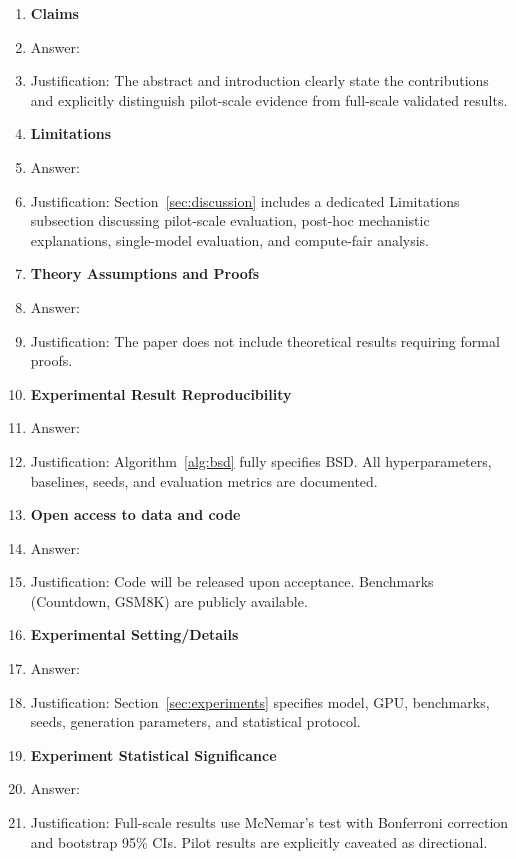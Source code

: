 \documentclass{article}
\begin{document}
\begin{enumerate}

\item {\bf Claims}
    \item[] Answer: \answerYes{}
    \item[] Justification: The abstract and introduction clearly state the contributions and explicitly distinguish pilot-scale evidence from full-scale validated results.

\item {\bf Limitations}
    \item[] Answer: \answerYes{}
    \item[] Justification: Section~\ref{sec:discussion} includes a dedicated Limitations subsection discussing pilot-scale evaluation, post-hoc mechanistic explanations, single-model evaluation, and compute-fair analysis.

\item {\bf Theory Assumptions and Proofs}
    \item[] Answer: \answerNA{}
    \item[] Justification: The paper does not include theoretical results requiring formal proofs.

\item {\bf Experimental Result Reproducibility}
    \item[] Answer: \answerYes{}
    \item[] Justification: Algorithm~\ref{alg:bsd} fully specifies BSD. All hyperparameters, baselines, seeds, and evaluation metrics are documented.

\item {\bf Open access to data and code}
    \item[] Answer: \answerNo{}
    \item[] Justification: Code will be released upon acceptance. Benchmarks (Countdown, GSM8K) are publicly available.

\item {\bf Experimental Setting/Details}
    \item[] Answer: \answerYes{}
    \item[] Justification: Section~\ref{sec:experiments} specifies model, GPU, benchmarks, seeds, generation parameters, and statistical protocol.

\item {\bf Experiment Statistical Significance}
    \item[] Answer: \answerYes{}
    \item[] Justification: Full-scale results use McNemar's test with Bonferroni correction and bootstrap 95\% CIs. Pilot results are explicitly caveated as directional.


\end{enumerate}
\end{document}
